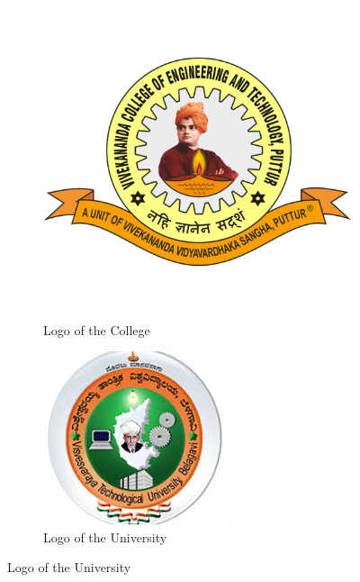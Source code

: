 \documentclass{article}
\begin{document}
	\begin{figure}[htbp]
		\begin{subfigure}[b]{0.45\textwidth}
		\centering\includegraphics[width=\textwidth]{vcet_logo.png}
		\caption{Logo of the College}
			\label{Fig:Image}
		\end{subfigure}
		\hfill
	\begin{subfigure}[b]{0.4\textwidth}
	\centering\includegraphics[width=\textwidth]{vtu.jpeg}
	\caption{Logo of the University}
	\label{Fig:Image}
\end{subfigure}
		
	\end{figure}
\end{document}

